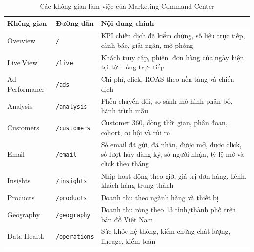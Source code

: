 \begin{table}[H]
\centering
\caption{Các không gian làm việc của Marketing Command Center}
\label{tab:workspaces}
\small
\renewcommand{\arraystretch}{1.2}
\begin{tabularx}{\textwidth}{>{\raggedright\arraybackslash}p{3.0cm} >{\raggedright\arraybackslash}p{2.2cm} >{\raggedright\arraybackslash}X}
\toprule
\textbf{Không gian} & \textbf{Đường dẫn} & \textbf{Nội dung chính} \\
\midrule
Overview & \texttt{/} & KPI chiến dịch đã kiểm chứng, số liệu trực tiếp, cảnh báo, giải ngân, mô phỏng \\
Live View & \texttt{/live} & Khách truy cập, phiên, đơn hàng của ngày hiện tại từ luồng trực tiếp \\
Ad Performance & \texttt{/ads} & Chi phí, click, ROAS theo nền tảng và chiến dịch \\
Analysis & \texttt{/analysis} & Phễu chuyển đổi, so sánh mô hình phân bổ, hành trình mẫu \\
Customers & \texttt{/customers} & Customer 360, dòng thời gian, phân đoạn, cohort, cơ hội và rủi ro \\
Email & \texttt{/email} & Số email đã gửi, đã nhận, được mở, được click, số lượt hủy đăng ký, số người nhận, tỷ lệ mở và click theo tháng \\
Insights & \texttt{/insights} & Nhịp hoạt động theo giờ, giá trị đơn hàng, kênh, khách hàng trung thành \\
Products & \texttt{/products} & Doanh thu theo ngành hàng và thiết bị \\
Geography & \texttt{/geography} & Doanh thu ròng theo 13 tỉnh/thành phố trên bản đồ Việt Nam \\
Data Health & \texttt{/operations} & Sức khỏe hệ thống, kiểm chứng chất lượng, lineage, kiểm toán \\
\bottomrule
\end{tabularx}
\end{table}


